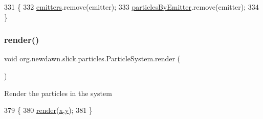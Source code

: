 \begin{DoxyCode}
331                                                        \{
332         \mbox{\hyperlink{classorg_1_1newdawn_1_1slick_1_1particles_1_1_particle_system_aee956700fc1881201435275fdd6fc32b}{emitters}}.remove(emitter);
333         \mbox{\hyperlink{classorg_1_1newdawn_1_1slick_1_1particles_1_1_particle_system_aec10bb63c0065ee17c8d8133936f5db6}{particlesByEmitter}}.remove(emitter);
334     \}
\end{DoxyCode}
\mbox{\label{classorg_1_1newdawn_1_1slick_1_1particles_1_1_particle_system_a81fd0123e1b180410a33e80a052cbfac}} 
\subsubsection{\texorpdfstring{render()}{render()}\hspace{0.1cm}{\footnotesize\ttfamily [1/2]}}
{\footnotesize\ttfamily void org.\+newdawn.\+slick.\+particles.\+Particle\+System.\+render (\begin{DoxyParamCaption}{ }\end{DoxyParamCaption})\hspace{0.3cm}{\ttfamily [inline]}}

Render the particles in the system 
\begin{DoxyCode}
379                          \{
380         \mbox{\hyperlink{classorg_1_1newdawn_1_1slick_1_1particles_1_1_particle_system_a81fd0123e1b180410a33e80a052cbfac}{render}}(\mbox{\hyperlink{classorg_1_1newdawn_1_1slick_1_1particles_1_1_particle_system_a3a332738b4f587da66ea20842e5745cc}{x}},\mbox{\hyperlink{classorg_1_1newdawn_1_1slick_1_1particles_1_1_particle_system_a507fdd9d8d8f431e3d70ec770e6f9bb7}{y}});
381     \}
\end{DoxyCode}
\mbox{\label{classorg_1_1newdawn_1_1slick_1_1particles_1_1_particle_system_a2c6703bdde8ad93ee26c400e78454ee1}} 
